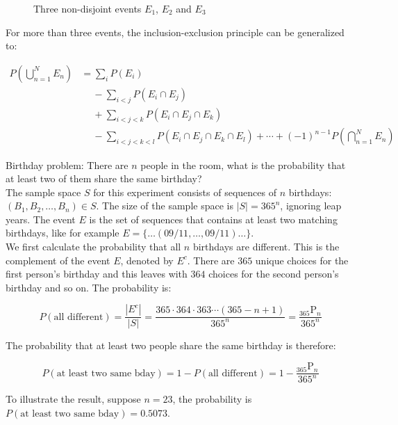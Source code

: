 \documentclass[12pt, a4paper]{article}
\newcounter{exa}
\begin{document}
\begin{enumerate}[i]
\begin{figure}[H]
\centering
{}  
\caption{Three non-disjoint events $E_1$, $E_2$ and $E_3$}
\end{figure}

For more than three events, the inclusion-exclusion principle can be generalized to:

\begin{align*}
P\left( \bigcup_{n=1}^N E_n \right) &= \sum_{i} P(E_i) \\
&\phantom{-} - \sum_{i<j} P(E_i \cap E_j) \\
&\phantom{-} + \sum_{i<j<k} P(E_i \cap E_j \cap E_k) \\
&\phantom{-} - \sum_{i<j<k<l} P(E_i \cap E_j \cap E_k \cap E_l) + \cdots + (-1)^{n-1} P\left( \bigcap_{n=1}^N E_n \right)
\end{align*}
\end{enumerate}

\begin{texample}
Birthday problem: There are $n$ people in the room, what is the probability that at least two of them share the same birthday? \\

The sample space $S$ for this experiment consists of sequences of $n$ birthdays: $(B_1, B_2, \dots, B_n) \in S$. The size of the sample space is $|S|=365^n$, ignoring leap years. The event $E$ is the set of sequences that contains at least two matching birthdays, like for example $E=\{\dots (09/11, \dots, 09/11) \dots\}$. \\

We first calculate the probability that all $n$ birthdays are different. This is the complement of the event $E$, denoted by $E^c$. There are $365$ unique choices for the first person's birthday and this leaves with $364$ choices for the second person's birthday and so on. The probability is:

$$ P(\text{all different})=\frac{|E^c|}{|S|}=\frac{365 \cdot 364 \cdot 363 \cdots (365-n+1)}{365^n}=\frac{{}_{365} \mathrm{P}_n}{365^n}$$

The probability that at least two people share the same birthday is therefore:

$$P(\text{at least two same bday})=1-P(\text{all different})=1-\frac{{}_{365} \mathrm{P}_n}{365^n}$$

To illustrate the result, suppose $n=23$, the probability is $P(\text{at least two same bday})=0.5073$.
\end{texample}
\end{document}
